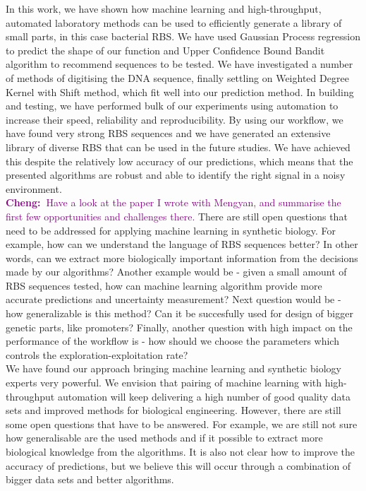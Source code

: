 \documentclass{article}
\newcommand{\cheng}[1]{\textcolor{purple}{{\bf Cheng:~}#1}}
\begin{document}
In this work, we have shown how machine learning and high-throughput, automated laboratory methods can be used to efficiently generate a library of small parts, in this case bacterial RBS. 
We have used Gaussian Process regression to predict the shape of our function and Upper Confidence Bound Bandit algorithm to recommend sequences to be tested.
We have investigated a number of methods of digitising the DNA sequence, finally settling on Weighted Degree Kernel with Shift method, which fit well into our prediction method.
In building and testing, we have performed bulk of our experiments using automation to increase their speed, reliability and reproducibility.
By using our workflow, we have found very strong RBS sequences and we have generated an extensive library of diverse RBS that can be used in the future studies.
We have achieved this despite the relatively low accuracy of our predictions, which means that the presented algorithms are robust and able to identify the right signal in a noisy environment. \\

\cheng{Have a look at the paper I wrote with Mengyan, and summarise the first few opportunities and challenges there.}
There are still open questions that need to be addressed for applying machine learning in synthetic biology.
For example, how can we understand the language of RBS sequences better?
In other words, can we extract more biologically important information from the decisions made by our algorithms?
Another example would be - given a small amount of RBS sequences tested, how can machine learning algorithm provide more accurate predictions and uncertainty measurement? 
Next question would be - how generalizable is this method? Can it be succesfully used for design of bigger genetic parts, like promoters?
Finally, another question with high impact on the performance of the workflow is - how should we choose the parameters which controls the exploration-exploitation rate? \\

We have found our approach bringing machine learning and synthetic biology experts very powerful.
We envision that pairing of machine learning with high-throughput automation will keep delivering a high number of good quality data sets and improved methods for biological engineering.
However, there are still some open questions that have to be answered.
For example, we are still not sure how generalisable are the used methods and if it possible to extract more biological knowledge from the algorithms.
It is also not clear how to improve the accuracy of predictions, but we believe this will occur through  a combination of bigger data sets and better algorithms.\\
\end{document}
